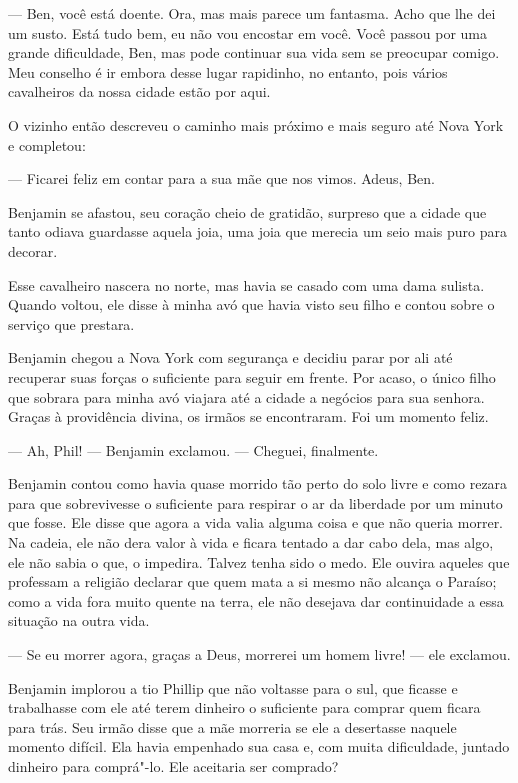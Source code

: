 --- Ben, você está doente. Ora, mas
mais parece um fantasma. Acho que lhe dei um susto. Está tudo bem, eu
não vou encostar em você. Você passou por uma grande dificuldade, Ben,
mas pode continuar sua vida sem se preocupar comigo. Meu conselho é ir
embora desse lugar rapidinho, no entanto, pois vários cavalheiros da
nossa cidade estão por aqui.

O vizinho então descreveu o caminho mais próximo e mais seguro até Nova
York e completou:

--- Ficarei feliz em contar para a sua mãe que nos vimos. Adeus, Ben.

Benjamin se afastou, seu coração cheio
de gratidão, surpreso que a cidade que tanto odiava guardasse aquela
joia, uma joia que merecia um seio mais puro para decorar.

Esse cavalheiro nascera no norte, mas
havia se casado com uma dama sulista. Quando voltou, ele disse à minha
avó que havia visto seu filho e contou sobre o serviço que prestara.

Benjamin chegou a Nova York com
segurança e decidiu parar por ali até recuperar suas forças o suficiente
para seguir em frente. Por acaso, o único filho que sobrara para minha
avó viajara até a cidade a negócios para sua senhora. Graças à
providência divina, os irmãos se encontraram. Foi um momento feliz.

--- Ah, Phil! --- Benjamin exclamou. --- Cheguei, finalmente.

Benjamin contou como havia quase morrido tão perto do solo livre e como
rezara para que sobrevivesse o suficiente para respirar o ar da
liberdade por um minuto que fosse. Ele disse que agora a vida valia
alguma coisa e que não queria morrer. Na cadeia, ele não dera valor à
vida e ficara tentado a dar cabo dela, mas algo, ele não sabia o que, o
impedira. Talvez tenha sido o medo. Ele ouvira aqueles que professam a
religião declarar que quem mata a si mesmo não alcança o Paraíso; como a
vida fora muito quente na terra, ele não desejava dar continuidade a
essa situação na outra vida.

--- Se eu morrer agora, graças a Deus, morrerei um homem livre! --- ele
exclamou.

Benjamin implorou a tio Phillip que não
voltasse para o sul, que ficasse e trabalhasse com ele até terem
dinheiro o suficiente para comprar quem ficara para trás. Seu irmão
disse que a mãe morreria se ele a desertasse naquele momento difícil.
Ela havia empenhado sua casa e, com muita dificuldade, juntado dinheiro
para comprá"-lo. Ele aceitaria ser comprado?

